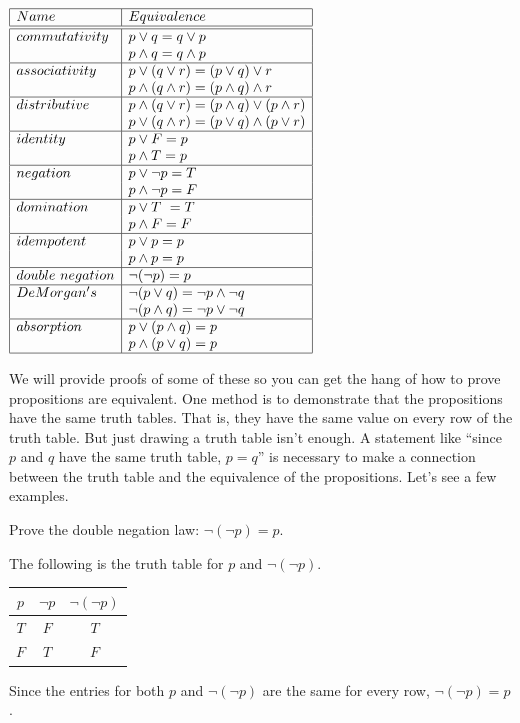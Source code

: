 \begin{table}[tbh]
\centering
$
\begin{array}{|l|l|}
\hline
Name&Equivalence\\
\hline
\hline
commutativity	& p\vee q=q\vee p\\
				& p\wedge q = q\wedge p\\
\hline
associativity	&p\vee(q\vee r)=(p\vee q)\vee r\\
				&p\wedge(q\wedge r)=(p\wedge q)\wedge r\\
\hline
distributive&	p\wedge(q\vee r) = (p\wedge q) \vee (p\wedge r)\\
			&	p\vee(q\wedge r) = (p\vee q)\wedge(p\vee r)\\
\hline
identity&		p \vee F = p\\
			&		p\wedge T = p\\
\hline
negation&p\vee \neg p = T\\
		& p\wedge\neg p = F\\
\hline
domination&	  	 p\vee T \ = T\\
			&	p\wedge F = F\\
\hline
idempotent&		p\vee p=p\\
			&	 p\wedge p = p\\
\hline
double\ negation	& \neg (\neg p)=p	\\
\hline
DeMorgan's	&	 \neg( p \vee q) = \neg p\wedge\neg q\\
			&	\neg (p\wedge q) = \neg p\vee\neg q\\
\hline
absorption & p\vee(p\wedge q) = p\\
& p\wedge(p\vee q) = p\\
\hline
\end{array}
$
\caption{Common Logical Equivalences}\label{table:logicLaws}
\end{table}



We will provide proofs of some of these so you can get the hang of how to prove propositions
are equivalent.  One method is to demonstrate that the propositions have the same truth tables.
That is, they have the same value on every row of the truth table.  But just drawing a truth table
isn't enough.  A statement like ``since $p$ and $q$ have the same truth table, $p=q$'' is necessary
to make a connection between the truth table and the equivalence of the propositions. 
Let's see a few examples.

\begin{exa}
Prove the double negation law: $\neg (\neg p) = p$.
\begin{pf}
The following is the truth table for $p$ and $\neg (\neg p)$.  

\centering
\begin{tabular}{|c|cc|}
\hline $p$ & $\neg p $ & $\neg (\neg p)$ \\
\hline
$T$ & $F $ & $T $ \\
$F$ & $T$ & $F$ \\
\hline
\end{tabular}

Since the entries for both $p$ and $\neg(\neg p)$ are the same for every row, $\neg (\neg p) = p$.
\end{pf}
\end{exa}
  
